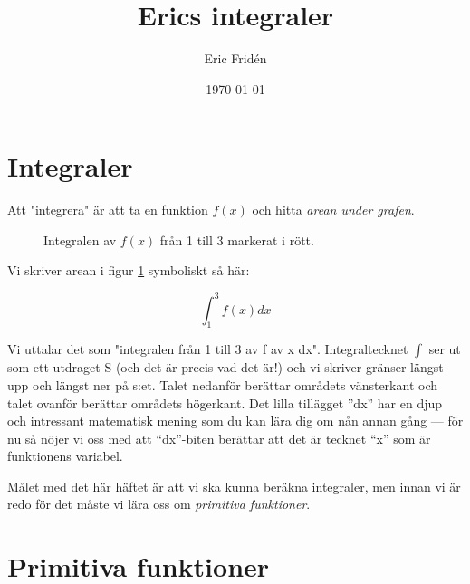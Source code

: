 \documentclass[a4paper, 12pt]{article}
\title{Erics integraler}
\author{Eric Fridén}
\date{\today}
\begin{document}
\doublespacing
\maketitle

\section{Integraler}
Att "integrera" är att ta en funktion $f(x)$ och hitta \emph{arean under grafen}. 

\begin{figure}[h]
    \centering
    \caption{Integralen av $f(x)$ från 1 till 3 markerat i rött.}
    \label{fig:1}
\end{figure}

Vi skriver arean i figur \ref{fig:1} symboliskt så här: 

\[ \int_1^3 f(x)dx \] 

Vi uttalar det som "integralen från 1 till 3 av f av x dx". Integraltecknet $\int$ ser ut som ett utdraget S (och det är precis vad det är!) och vi skriver gränser längst upp och längst ner på s:et. Talet nedanför berättar områdets vänsterkant och talet ovanför berättar områdets högerkant. Det lilla tillägget ''dx'' har en djup och intressant matematisk mening som du kan lära dig om nån annan gång --- för nu så nöjer vi oss med att ``dx''-biten berättar att det är tecknet ``x'' som är funktionens variabel.

Målet med det här häftet är att vi ska kunna beräkna integraler, men innan vi är redo för det måste vi lära oss om \emph{primitiva funktioner}.

\section{Primitiva funktioner}
\end{document}
